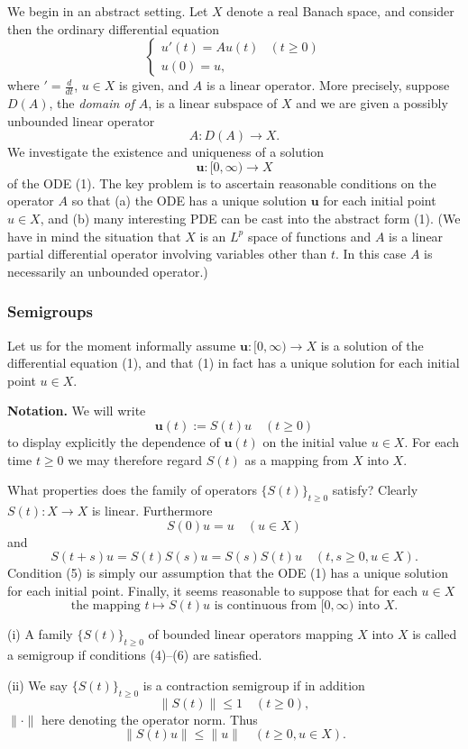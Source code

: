 We begin in an abstract setting. Let $X$ denote a real Banach space, and consider then the ordinary differential equation
\[
\begin{cases}
u'(t) = Au(t) & (t \geq 0) \\
u(0) = u,
\end{cases}
\tag{1}
\]
where ${}' = \frac{d}{dt}$, $u \in X$ is given, and $A$ is a linear operator. More precisely, suppose $D(A)$, the \textit{domain of $A$}, is a linear subspace of $X$ and we are given a possibly unbounded linear operator
\[
A : D(A) \to X.
\tag{2}
\]
We investigate the existence and uniqueness of a solution
\[
\mathbf{u} : [0, \infty) \to X
\]
of the ODE (1). The key problem is to ascertain reasonable conditions on the operator $A$ so that (a) the ODE has a unique solution $\mathbf{u}$ for each initial point $u \in X$, and (b) many interesting PDE can be cast into the abstract form (1). (We have in mind the situation that $X$ is an $L^p$ space of functions and $A$ is a linear partial differential operator involving variables other than $t$. In this case $A$ is necessarily an unbounded operator.)

\subsubsection{Semigroups}

Let us for the moment informally assume $\mathbf{u} : [0, \infty) \to X$ is a solution of the differential equation (1), and that (1) in fact has a unique solution for each initial point $u \in X$.

\noindent\textbf{Notation.} We will write
\[
\mathbf{u}(t) := S(t)u \quad (t \geq 0)
\tag{3}
\]
to display explicitly the dependence of $\mathbf{u}(t)$ on the initial value $u \in X$. For each time $t \geq 0$ we may therefore regard $S(t)$ as a mapping from $X$ into $X$.

What properties does the family of operators $\{S(t)\}_{t \geq 0}$ satisfy? Clearly $S(t) : X \to X$ is linear. Furthermore
\[
S(0)u = u \quad (u \in X)
\tag{4}
\]
and
\[
S(t + s)u = S(t)S(s)u = S(s)S(t)u \quad (t, s \geq 0, u \in X).
\tag{5}
\]
Condition (5) is simply our assumption that the ODE (1) has a unique solution for each initial point. Finally, it seems reasonable to suppose that for each $u \in X$
\[
\text{the mapping } t \mapsto S(t)u \text{ is continuous from } [0, \infty) \text{ into } X.
\tag{6}
\]

\begin{definition}
\label{def:semigroup-contraction-semigroup}
(i) A family $\{S(t)\}_{t \geq 0}$ of bounded linear operators mapping $X$ into $X$ is called a semigroup if conditions (4)--(6) are satisfied.

(ii) We say $\{S(t)\}_{t \geq 0}$ is a contraction semigroup if in addition
\[
\|S(t)\| \leq 1 \quad (t \geq 0),
\tag{7}
\]
$\|\cdot\|$ here denoting the operator norm. Thus
\[
\|S(t)u\| \leq \|u\| \quad (t \geq 0, u \in X).
\]
\end{definition}

